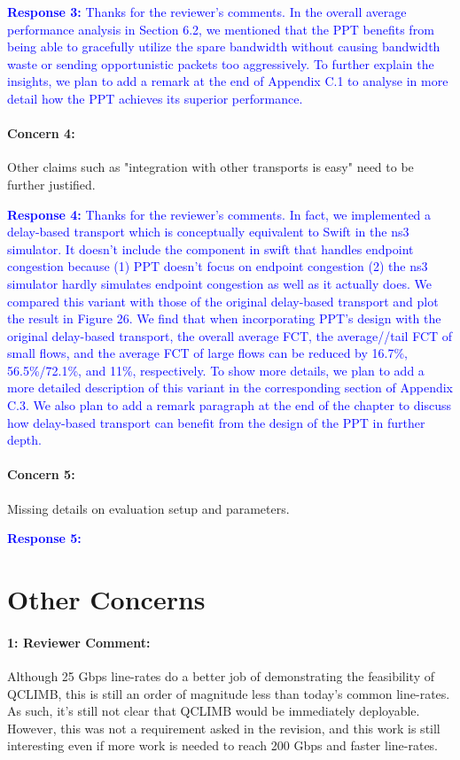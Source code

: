 \documentclass[12pt,one-column]{article}
\begin{document}
\noindent\textcolor{blue}{\textbf{Response 3:} 
Thanks for the reviewer’s comments. 
In the overall average performance analysis in Section 6.2, we mentioned that the PPT benefits from being able to gracefully utilize the spare bandwidth without causing bandwidth waste or sending opportunistic packets too aggressively.
To further explain the insights, we plan to add a remark at the end of Appendix C.1 to analyse in more detail how the PPT achieves its superior performance.
}

{\it \paragraph{Concern 4:} Other claims such as "integration with other transports is easy" need to be further justified.}


\noindent\textcolor{blue}{\textbf{Response 4:} 
Thanks for the reviewer’s comments. 
In fact, we implemented a delay-based transport which is conceptually equivalent to Swift in the ns3 simulator.
It doesn't include the component in swift that handles endpoint congestion because (1) PPT doesn't focus on endpoint congestion (2) the ns3 simulator hardly simulates endpoint congestion as well as it actually does. 
We compared this variant with those of the original delay-based transport and plot the result in Figure 26.
We find that when incorporating PPT's design with the original delay-based transport, the overall average FCT, the average//tail FCT of small flows, and the average FCT of large flows can be reduced by 16.7\%, 56.5\%/72.1\%, and 11\%, respectively.
To show more details, we plan to add a more detailed description of this variant in the corresponding section of Appendix C.3.
We also plan to add a remark paragraph at the end of the chapter to discuss how delay-based transport can benefit from the design of the PPT in further depth.
}

{\it \paragraph{Concern 5:}Missing details on evaluation setup and parameters.}


\noindent\textcolor{blue}{\textbf{Response 5:} }
	
\section{Other Concerns}
{\it \paragraph{1: Reviewer Comment:} Although 25 Gbps line-rates do a better job of demonstrating the feasibility of QCLIMB, this is still an order of magnitude less than today's common line-rates. As such, it's still not clear that QCLIMB would be immediately deployable. However, this was not a requirement asked in the revision, and this work is still interesting even if more work is needed to reach 200 Gbps and faster line-rates. }
\end{document}
